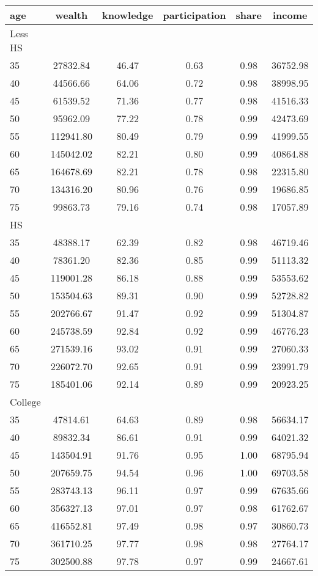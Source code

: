  \begin{tabular}{lccccc}
 \hline \hline
  age & wealth & knowledge & participation & share & income \\
 \hline
 Less HS & & & & & \\
 \hline
35 &  27832.84 &     46.47 &      0.63 &      0.98 &  36752.98 \\ 
40 &  44566.66 &     64.06 &      0.72 &      0.98 &  38998.95 \\ 
45 &  61539.52 &     71.36 &      0.77 &      0.98 &  41516.33 \\ 
50 &  95962.09 &     77.22 &      0.78 &      0.99 &  42473.69 \\ 
55 & 112941.80 &     80.49 &      0.79 &      0.99 &  41999.55 \\ 
60 & 145042.02 &     82.21 &      0.80 &      0.99 &  40864.88 \\ 
65 & 164678.69 &     82.21 &      0.78 &      0.98 &  22315.80 \\ 
70 & 134316.20 &     80.96 &      0.76 &      0.99 &  19686.85 \\ 
75 &  99863.73 &     79.16 &      0.74 &      0.98 &  17057.89 \\ 
 \hline
 HS & & & & & \\
 \hline
35 &  48388.17 &     62.39 &      0.82 &      0.98 &  46719.46 \\ 
40 &  78361.20 &     82.36 &      0.85 &      0.99 &  51113.32 \\ 
45 & 119001.28 &     86.18 &      0.88 &      0.99 &  53553.62 \\ 
50 & 153504.63 &     89.31 &      0.90 &      0.99 &  52728.82 \\ 
55 & 202766.67 &     91.47 &      0.92 &      0.99 &  51304.87 \\ 
60 & 245738.59 &     92.84 &      0.92 &      0.99 &  46776.23 \\ 
65 & 271539.16 &     93.02 &      0.91 &      0.99 &  27060.33 \\ 
70 & 226072.70 &     92.65 &      0.91 &      0.99 &  23991.79 \\ 
75 & 185401.06 &     92.14 &      0.89 &      0.99 &  20923.25 \\ 
 \hline
 College & & & & & \\
 \hline
35 &  47814.61 &     64.63 &      0.89 &      0.98 &  56634.17 \\ 
40 &  89832.34 &     86.61 &      0.91 &      0.99 &  64021.32 \\ 
45 & 143504.91 &     91.76 &      0.95 &      1.00 &  68795.94 \\ 
50 & 207659.75 &     94.54 &      0.96 &      1.00 &  69703.58 \\ 
55 & 283743.13 &     96.11 &      0.97 &      0.99 &  67635.66 \\ 
60 & 356327.13 &     97.01 &      0.97 &      0.98 &  61762.67 \\ 
65 & 416552.81 &     97.49 &      0.98 &      0.97 &  30860.73 \\ 
70 & 361710.25 &     97.77 &      0.98 &      0.98 &  27764.17 \\ 
75 & 302500.88 &     97.78 &      0.97 &      0.99 &  24667.61 \\ 
 \hline \hline
 \end{tabular}
